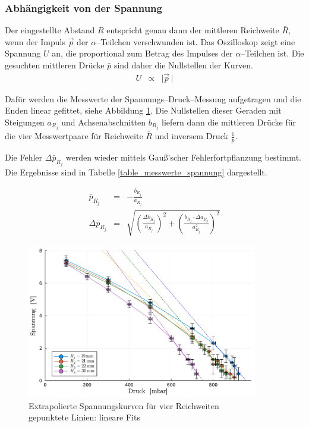 \documentclass[12pt,a4paper]{scrartcl}
\numberwithin{equation}{section} %
\begin{document}
\hypertarget{bestimmung-durch-Spannung}{%
	\subsubsection{Abhängigkeit von der Spannung}\label{bestimmung-durch-Spannung}}

Der eingestellte Abstand $R$ entspricht genau dann der mittleren Reichweite $\bar{R}$, wenn der Impuls $\vec{p}$ der $\alpha$--Teilchen verschwunden ist. Das Oszilloskop zeigt eine Spannung $U$ an, die proportional zum Betrag des  Impulses der $\alpha$--Teilchen ist. Die gesuchten mittleren Drücke $\bar{p}$ sind daher die Nullstellen der Kurven.
\begin{eqnarray}
	U &\propto& \lvert \vec{p}\, \rvert
\end{eqnarray}

\noindent
Dafür werden die Messwerte der Spannungs--Druck--Messung aufgetragen und die Enden linear gefittet, siehe Abbildung \ref{fig:spannungskurveExtrapoliert}. Die Nullstellen dieser Geraden mit Steigungen $a_{R_j}$ und Achsenabschnitten $b_{R_j}$ liefern dann die mittleren Drücke für die vier Messwertpaare für Reichweite $\bar{R}$ und inversem Druck $\frac{1}{\bar{p}}$.

Die Fehler $\Delta  \bar p_{R_j}$ werden wieder mittels Gauß'scher Fehlerfortpflanzung bestimmt. Die Ergebnisse sind in Tabelle \ref{table_messwerte_spannung} dargestellt.

\begin{eqnarray}
\bar{p}_{R_j} &=& - \frac{b_{R_j}}{a_{R_j}} \\
	\Delta \bar{p}_{R_j} &=& \sqrt{\left(\frac{\Delta b_{R_j}}{a_{R_j}}\right)^2 + \left(\frac{b_{R_j} \cdot \Delta a_{R_j}}{a_{R_j}^2}\right)^2}
\end{eqnarray}

\begin{figure}[H]
	\centering
	\includegraphics[width=0.9\textwidth]{../media/B3.3/spannungskurven extrapoliert.pdf}
	\caption{Extrapolierte Spannungskurven für vier Reichweiten \\
		gepunktete Linien: lineare Fits}
	\label{fig:spannungskurveExtrapoliert}
\end{figure}
\end{document}
